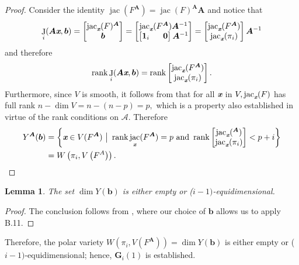 \documentclass[a4paper]{article}
\def\sA{\mathscr{A}}
\def\bz{\textit{\textbf{0}}}
\def\Xb{\textit{\textbf{X}}}
\def\mA{{\bm A}}
\def\xb{\textit{\textbf{x}}}
\def\vt{\vartheta}
\DeclareMathOperator{\J}{J}
\DeclareMathOperator{\jac}{jac}
\DeclareMathOperator{\rk}{rank}
\def\C{\mathbb{C}}
\def\bbm{\begin{bmatrix}}
\def\ebm{\end{bmatrix}}
\def\gi{\Gamma_i}
\newtheorem{lemma}[theorem]{Lemma}
\begin{document}
    \begin{proof}
    Consider the identity $\jac(F^{\mA}) = \jac(F)^{\mA}\mA$ and notice that
    \[
    \J_i(\mA\xb,\bm b)
    =
    \bbm 
    \jac_{\xb}(F)^\mA\\
    \bm b
     \ebm
     =
    \bbm 
    \jac_{\xb}(F^\mA)\mA^{-1}\\
    \bbm
    \bm 1_i ~~~~~ \bm 0
    \ebm\mA^{-1} 
     \ebm
     =
     \bbm 
    \jac_{\xb}(F^\mA)\\
    \jac_{\xb}(\pi_i)
     \ebm
    \mA^{-1}
    \]
    and therefore 
    \[
    \rk \J_i(\mA\xb,\bm b)
    =
    \rk
     \bbm 
    \jac_{\xb}(F^\mA)\\
    \jac_{\xb}(\pi_i)
     \ebm.
    \]
    Furthermore, since $V$ is smooth, it follows from \cite[Corollary 16.20]{ECA} that for all $\xb$ in $V, \jac_{\xb}(F)$ has full rank $n - \dim V = n -(n-p) = p ,$ which is a property also established in virtue of the rank conditions on $\sA.$
    Therefore 
    \begin{align*}
     Y^{\mA}(\bm b) &= \left\{\xb \in V(F^{\mA})~
    \big|~\rk \jac_{\xb}(F^{\mA})=p
    \textrm{ and }
    \rk     
    \bbm 
    \jac_{\xb}(^{\mA})\\
    \jac_{\xb}(\pi_i)
     \ebm
     < p+i\right\} \\
     &= W\left(\pi_i,V\left(F^A\right)\right). 
    \end{align*}
    \end{proof}
    \begin{lemma}
    The set $\dim Y(\bm b)$ is either empty or ($i-1)$-equidimensional.
    \end{lemma}
    \begin{proof}
    The conclusion follows from \cite[Lemma B.5, Lemma B.11]{TWT}, where our choice of $\bm b$ allows us to apply B.11. 
    \end{proof}
    \noindent
    Therefore, the polar variety $W(\pi_i,V(F^{\mA}))=\dim Y(\bm b)$ is either empty or ($i-1)$-equidimensional; hence, $\bm G_i(1)$ is established. 
     
\end{document}
